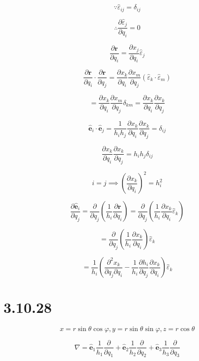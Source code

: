 \documentclass[12pt]{article}
\begin{document}
\[
    \because  \hat{\varepsilon}_{ij} = \delta_{ij}
\]

\[
    \therefore \frac{\partial \hat{\varepsilon}_j}{\partial q_i} = 0
\]

\[
    \frac{\partial \textbf{r}}{\partial q_i} = \frac{\partial x_j}{\partial q_i} \hat{\varepsilon}_j
\]

\[
    \frac{\partial \textbf{r}}{\partial q_i} \cdot \frac{\partial \textbf{r}}{\partial q_j}
    = \frac{\partial x_k}{\partial q_i} \frac{\partial x_m}{\partial q_j}
    \left(\hat{\varepsilon}_k \cdot \hat{\varepsilon}_m\right)
\]

\[
    = \frac{\partial x_k}{\partial q_i} \frac{\partial x_m}{\partial q_j} \delta_{km}
    = \frac{\partial x_k}{\partial q_i} \frac{\partial x_k}{\partial q_j}
\]

\[
    \hat{\textbf{e}}_i \cdot \hat{\textbf{e}}_j
    = \frac{1}{h_i h_j} \frac{\partial x_k}{\partial q_i} \frac{\partial x_k}{\partial q_j} = \delta_{ij}
\]

\[
    \frac{\partial x_k}{\partial q_i} \frac{\partial x_k}{\partial q_j} = h_i h_j \delta_{ij}
\]

\[
    i = j \implies {\left(\frac{\partial x_k}{\partial q_i}\right)}^2 = h_i^2
\]

\[
    \frac{\partial \hat{\textbf{e}}_i}{\partial q_j} = \frac{\partial}{\partial q_j}
    \left(\frac{1}{h_i} \frac{\partial \textbf{r}}{\partial q_i}\right)
    = \frac{\partial}{\partial q_j} \left(\frac{1}{h_i} \frac{\partial x_k}{\partial q_i} \hat{\varepsilon}_k\right)
\]

\[
    = \frac{\partial}{\partial q_j} \left(\frac{1}{h_i} \frac{\partial x_k}{\partial q_i}\right) \hat{\varepsilon}_k
\]

\[
    = \frac{1}{h_i}
    \left(
    \frac{\partial^2 x_k}{\partial q_j \partial q_i}
    - \frac{1}{h_i} \frac{\partial h_i}{\partial q_j} \frac{\partial x_k}{\partial q_i}
    \right) \hat{\varepsilon}_k
\] %

\section{3.10.28}

\[
    x = r \sin{\theta} \cos{\varphi}, y = r \sin{\theta} \sin{\varphi}, z = r \cos{\theta}
\]

\[
    \nabla = \hat{\textbf{e}}_1 \frac{1}{h_1} \frac{\partial}{\partial q_1}
    + \hat{\textbf{e}}_2 \frac{1}{h_2} \frac{\partial}{\partial q_2}
    + \hat{\textbf{e}}_3 \frac{1}{h_3} \frac{\partial}{\partial q_3}
\]
\end{document}
